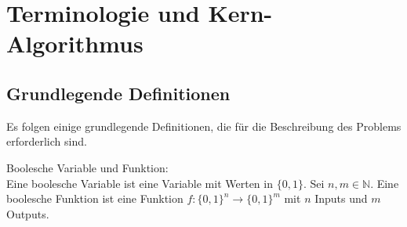 \documentclass[11pt, a4paper, german]{article}
\begin{document}
\section{Terminologie und Kern-Algorithmus}
\label{sec:terminologie&grundl}
\subsection{Grundlegende Definitionen}
\label{subsec:grundlegende_definitionen}
Es folgen einige grundlegende Definitionen, die für die Beschreibung des Problems erforderlich sind.

\begin{definition}{Boolesche Variable und Funktion: } \\
Eine boolesche Variable ist eine Variable mit Werten in $ \{ 0 , 1 \} $.
Sei $ n, m \in \mathbb{N}$. Eine boolesche Funktion ist eine Funktion $ f : \{ 0 , 1 \}^n \rightarrow \{ 0 , 1 \}^m $ mit $n$ Inputs und $m$ Outputs. 
\end{definition}
\end{document}
